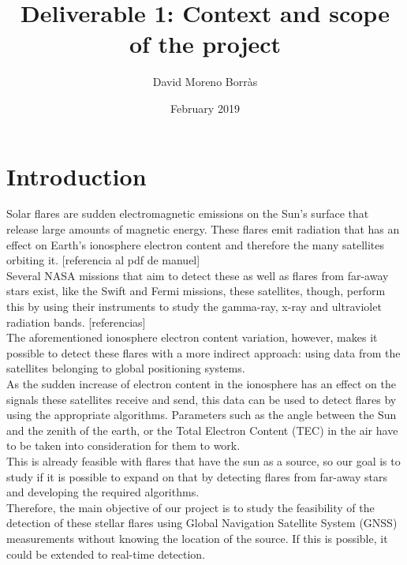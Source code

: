 \documentclass[12pt]{article}
\title{Deliverable 1: Context and scope of the project}
\author{David Moreno Borr\`as}
\date{February 2019}
\begin{document}
\maketitle

\newpage
\tableofcontents

\newpage
{}
\setcounter{page}{1}


\section{Introduction}

Solar flares are sudden electromagnetic emissions on the Sun’s surface that release large amounts of magnetic energy. These flares emit radiation that has an effect on Earth’s ionosphere electron content and therefore the many satellites orbiting it. [referencia al pdf de manuel]\\

Several NASA missions that aim to detect these as well as flares from far-away stars exist, like the Swift and Fermi missions, these satellites, though, perform this by using their instruments to study the gamma-ray, x-ray and ultraviolet radiation bands. [referencias]\\

The aforementioned ionosphere electron content variation, however, makes it possible to detect these flares with a more indirect approach: using data from the satellites belonging to global positioning systems.\\

As the sudden increase of electron content in the ionosphere has an effect on the signals these satellites receive and send, this data can be used to detect flares by using the appropriate algorithms. Parameters such as the angle between the Sun and the zenith of the earth, or the Total Electron Content (TEC) in the air have to be taken into consideration for them to work. \\

This is already feasible with flares that have the sun as a source, so our goal is to study if it is possible to expand on that by detecting flares from far-away stars and developing the required algorithms.\\

Therefore, the main objective of our project is to study the feasibility of the detection of these stellar flares using Global Navigation Satellite System (GNSS) measurements without knowing the location of the source. If this is possible, it could be extended to real-time detection.\\
\end{document}

